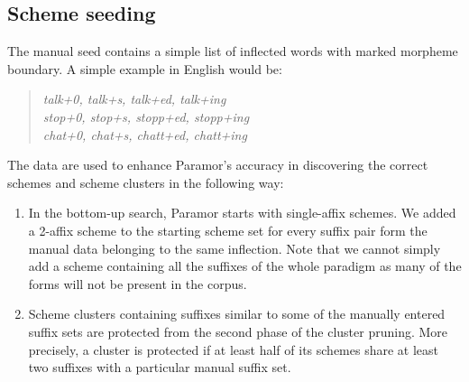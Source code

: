 \documentclass[11pt]{article}
\newcommand{\e}[1]{\textit{#1}} %
\newcommand{\todoja}[1]{[\textbf{TODOJ} #1]}
\newcommand{\todojd}[1]{} %
\begin{document}



\subsection{Scheme seeding}


\noindent
The manual seed contains a simple list of inflected words with marked morpheme boundary. A simple example in English would be:
\begin{quote}
\e{talk+0, talk+s, talk+ed, talk+ing}\\
\e{stop+0, stop+s, stopp+ed, stopp+ing}\\
\e{chat+0, chat+s, chatt+ed, chatt+ing}
%
\end{quote}

%

\noindent
The data are used to enhance Paramor's accuracy in discovering the correct schemes and scheme clusters in the following way:
\begin{enumerate}
\item In the bottom-up search, Paramor starts with single-affix schemes. We added a 2-affix scheme to the starting scheme set for every suffix pair form the manual data belonging to the same inflection. Note that we cannot simply add a scheme containing all the suffixes of the whole paradigm as many of the forms will not be present in the corpus.

\item Scheme clusters containing suffixes similar to some of the manually entered suffix sets are protected from the second phase of the cluster pruning. More precisely, a cluster is protected if at least half of its schemes share at least two suffixes with a particular manual suffix set.
\todojd{Is there any reason why half and two, and not, say, 60\% and 3?  \textbf{RK:} Not really -- similar criterion is often used in Paramor so I used it here as well.}



\end{enumerate}
\end{document}
